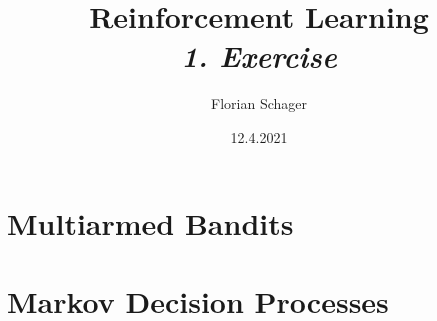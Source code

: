 \documentclass{article}
\title
{
  Reinforcement Learning \\
  \vspace{4pt}
  \normalsize
  \textit{1. Exercise}
}
\author
{
  Florian Schager
}
\date{12.4.2021}
\begin{document}
\maketitle

\section{Multiarmed Bandits}








\section{Markov Decision Processes}


















\printbibliography
\end{document}
